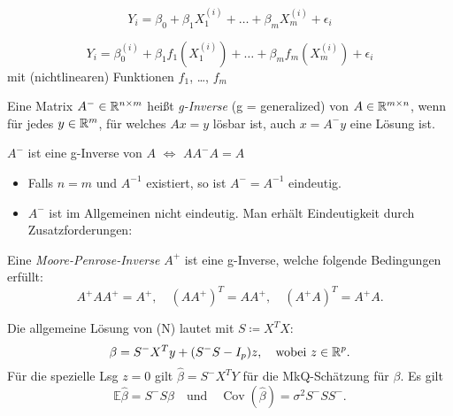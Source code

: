 \documentclass{cheat-sheet}
\newcommand{\E}{\mathbb{E}} %
\DeclareMathOperator{\cov}{Cov} %
\begin{document}



\begin{bsp}
  \[ Y_i = \beta_0 + \beta_1 X_1^{(i)} + \ldots + \beta_m X_m^{(i)} + \epsilon_i \]
\end{bsp}


\begin{bsp}
  \[ Y_i = \beta_0^{(i)} + \beta_1 f_1(X_1^{(i)}) + \ldots + \beta_m f_m(X_m^{(i)}) + \epsilon_i \]
  mit (nichtlinearen) Funktionen $f_1$, \ldots, $f_m$
\end{bsp}


\begin{defn}
  Eine Matrix $A^{-} \in \mathbb{R}^{n \times m}$ heißt \emph{g-Inverse} (g = generalized) von $A \in \mathbb{R}^{m \times n}$, wenn für jedes $y \in \mathbb{R}^m$, für welches $Ax = y$ lösbar ist, auch $x = A^{-} y$ eine Lösung ist.
\end{defn}

\begin{satz}
  $A^{-}$ ist eine g-Inverse von $A$ $\iff$ $A A^{-} A = A$
\end{satz}

\begin{bem}
  \begin{itemize}
    \item Falls $n = m$ und $A^{-1}$ existiert, so ist $A^{-} = A^{-1}$ eindeutig.
    \item $A^{-}$ ist im Allgemeinen nicht eindeutig.
    Man erhält Eindeutigkeit durch Zusatzforderungen:
  \end{itemize}
\end{bem}

\begin{defn}
  Eine \emph{Moore-Penrose-Inverse} $A^{+}$ ist eine g-Inverse, welche folgende Bedingungen erfüllt:
  \[
    A^{+} A A^{+} = A^{+}, \quad
    (A A^{+})^T = A A^{+}, \quad
    (A^{+} A)^T = A^{+} A.
  \]
\end{defn}


\begin{satz}
  Die allgemeine Lösung von (N) lautet mit $S \coloneqq X^T X$:
  \[
    \beta = S^{-} X^T y + (S^{-} S - I_p) z, \quad
    \text{wobei } z \in \mathbb{R}^p.
  \]
  Für die spezielle Lsg $z = 0$ gilt
  $\hat{\beta} = S^{-} X^T Y$
  für die MkQ-Schätzung für $\beta$.
  Es gilt
  \[
    \E \hat{\beta} = S^{-} S \beta
    \quad \text{und} \quad
    \cov(\hat{\beta}) = \sigma^2 S^{-} S S^{-}.
  \]
\end{satz}
\end{document}
